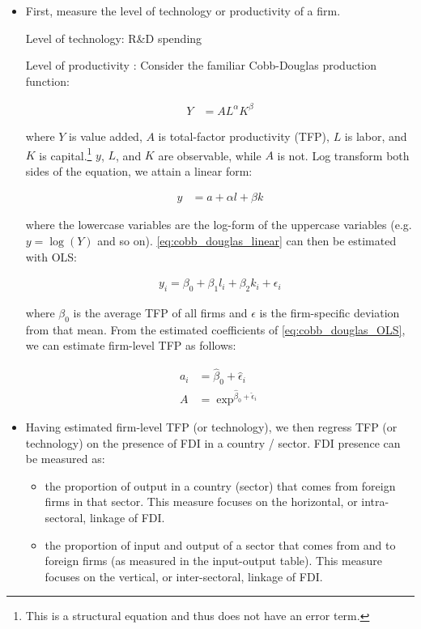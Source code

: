 \begin{itemize}
\item First, measure the level of technology or productivity of a firm.

Level of technology: R\&D spending

Level of productivity \citep{VanBeveren2012}: Consider the familiar Cobb-Douglas production function:

\begin{align}
Y &= AL^{\alpha}K^{\beta}
\end{align}

where $Y$ is value added, $A$ is total-factor productivity (TFP), $L$ is labor, and $K$ is capital.\footnote{This is a structural equation and thus does not have an error term.} $y$, $L$, and $K$ are observable, while $A$ is not. Log transform both sides of the equation, we attain a linear form:

\begin{align} \label{eq:cobb_douglas_linear}
y &= a + \alpha l + \beta k
\end{align}

where the lowercase variables are the log-form of the uppercase variables (e.g. $y = \log(Y)$ and so on). \autoref{eq:cobb_douglas_linear} can then be estimated with OLS:

\begin{align} \label{eq:cobb_douglas_OLS}
y_i = \beta_0 + \beta_1 l_i + \beta_2 k_i + \epsilon_i
\end{align} 

where $\beta_0$ is the average TFP of all firms and $\epsilon$ is the firm-specific deviation from that mean. From the estimated coefficients of \autoref{eq:cobb_douglas_OLS}, we can estimate firm-level TFP as follows:

\begin{align}
a_i &= \hat\beta_0 + \hat\epsilon_i \\
A &= \exp^{\hat\beta_0 + \hat\epsilon_i}
\end{align}

\item Having estimated firm-level TFP (or technology), we then regress TFP (or technology) on the presence of FDI in a country / sector. FDI presence can be measured as:
\begin{itemize}
\item the proportion of output in a country (sector) that comes from foreign firms in that sector. This measure focuses on the horizontal, or intra-sectoral, linkage of FDI.
\item the proportion of input and output of a sector that comes from and to foreign firms (as measured in the input-output table). This measure focuses on the vertical, or inter-sectoral, linkage of FDI.
\end{itemize}
\end{itemize}

